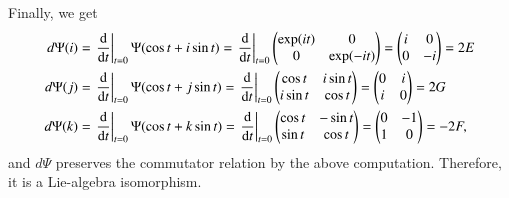 \documentclass[a4paper, 12pt]{article}
\theoremstyle{Mydefinition}
\theoremstyle{Mytheorem}
\begin{document}
Finally, we get
\begin{equation*}
\begin{split}
    d\Psi(i) &= \left.\dv{t}\right|_{t=0}\Psi(\cos t+i\sin t)= \left.\dv{t}\right|_{t=0}\begin{pmatrix}
        \exp(it) & 0 \\
        0 & \exp(-it)
    \end{pmatrix} = \begin{pmatrix}
        i & 0 \\
        0 & -i
    \end{pmatrix}=2E\\
    d\Psi(j) &= \left.\dv{t}\right|_{t=0}\Psi(\cos t+j\sin t)= \left.\dv{t}\right|_{t=0}\begin{pmatrix}
        \cos t & i\sin t \\
        i\sin t & \cos t
    \end{pmatrix} = \begin{pmatrix}
        0 & i \\
        i & 0
    \end{pmatrix}=2G\\
    d\Psi(k) &= \left.\dv{t}\right|_{t=0}\Psi(\cos t+k\sin t)= \left.\dv{t}\right|_{t=0}\begin{pmatrix}
        \cos t & -\sin t \\
        \sin t & \cos t
    \end{pmatrix} = \begin{pmatrix}
        0 & -1 \\
        1 & 0
    \end{pmatrix}=-2F,
\end{split}
\end{equation*}
and $d\Psi$ preserves the commutator relation by the above computation. Therefore, it is a Lie-algebra isomorphism.\\
\end{document}
